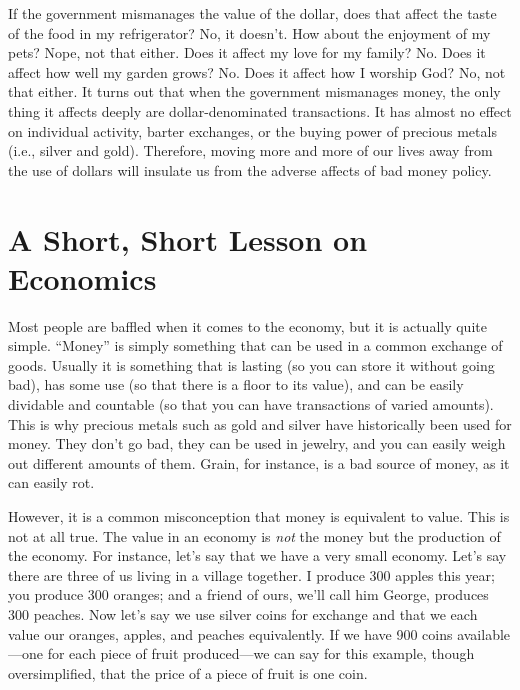 \documentclass[letterpaper]{article}
\begin{document}
{\color{black}
If the government mismanages the value of the dollar, does that affect
the taste of the food in my refrigerator?  No, it doesn’t. How about
the enjoyment of my pets?  Nope, not that either. Does it affect my
love for my family?  No. Does it affect how well my garden grows?  No.
Does it affect how I worship God? No, not that either. It turns out
that when the government mismanages money, the only thing it affects
deeply are dollar-denominated transactions. It has almost no effect on
individual activity, barter exchanges, or the buying power of precious
metals (i.e., silver and gold). Therefore, moving more and more of our
lives away from the use of dollars will insulate us from the adverse
affects of bad money policy.}

\section{A Short, Short Lesson on Economics}
{\color{black}
Most people are baffled when it comes to the economy, but it is actually
quite simple. “Money” is simply something that can be used in a common
exchange of goods. Usually it is something that is lasting (so you can
store it without going bad), has some use (so that there is a floor to
its value), and can be easily dividable and countable (so that you can
have transactions of varied amounts). This is why precious metals such
as gold and silver have historically been used for money. They don’t go
bad, they can be used in jewelry, and you can easily weigh out
different amounts of them. Grain, for instance, is a bad source of
money, as it can easily rot. }

{\color{black}
However, it is a common misconception that money is equivalent to value.
This is not at all true. The value in an economy is \textit{not} the
money but the production of the economy. For instance, let’s say that
we have a very small economy. Let’s say there are three of us living in
a village together. I produce 300 apples this year; you produce 300
oranges; and a friend of ours, we’ll call him George, produces 300
peaches. Now let’s say we use silver coins for exchange and that we
each value our oranges, apples, and peaches equivalently.
\textcolor[rgb]{0.32941177,0.5529412,0.83137256}{If w}e have 900 coins
available—one for each piece of fruit produced—we can say for this
example\textcolor[rgb]{0.32941177,0.5529412,0.83137256}{, though
oversimplified,} that the price of a piece of fruit is one coin. }
\end{document}
